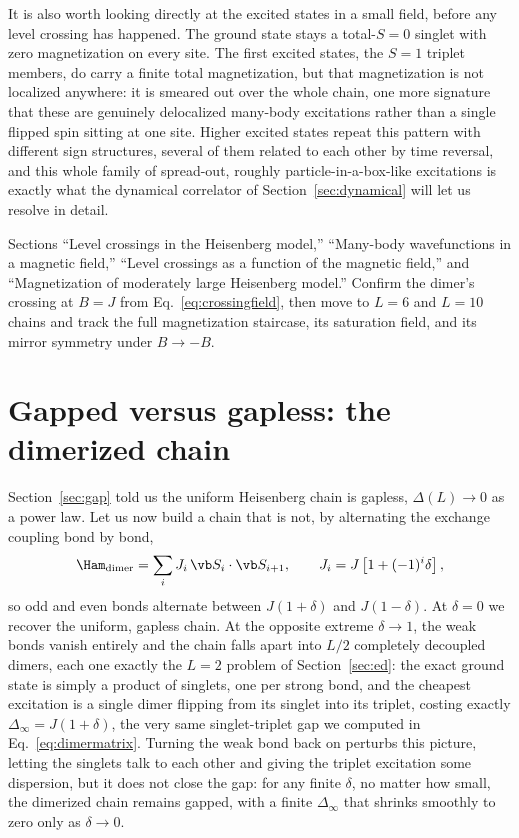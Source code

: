 \documentclass[all_sessions.tex]{subfiles}
\begin{document}
It is also worth looking directly at the excited states in a small field, before any level crossing has
happened. The ground state stays a total-$S=0$ singlet with zero magnetization on every site. The first
excited states, the $S=1$ triplet members, do carry a finite total magnetization, but that magnetization
is not localized anywhere: it is smeared out over the whole chain, one more signature that these are
genuinely delocalized many-body excitations rather than a single flipped spin sitting at one site.
Higher excited states repeat this pattern with different sign structures, several of them related to
each other by time reversal, and this whole family of spread-out, roughly particle-in-a-box-like
excitations is exactly what the dynamical correlator of Section~\ref{sec:dynamical} will let us resolve
in detail.

\begin{notebook}
Sections ``Level crossings in the Heisenberg model,'' ``Many-body wavefunctions in a magnetic
field,'' ``Level crossings as a function of the magnetic field,'' and ``Magnetization of moderately
large Heisenberg model.'' Confirm the dimer's crossing at $B=J$ from Eq.~\eqref{eq:crossingfield},
then move to $L=6$ and $L=10$ chains and track the full magnetization staircase, its saturation field,
and its mirror symmetry under $B\to-B$.
\end{notebook}

\section{Gapped versus gapless: the dimerized chain}
\label{sec:dimerization}
Section~\ref{sec:gap} told us the uniform Heisenberg chain is gapless, $\Delta(L)\to0$ as a power law.
Let us now build a chain that is not, by alternating the exchange coupling bond by bond,
\begin{equation}
  \Ham_{\mathrm{dimer}} = \sum_i J_i\, \vb S_i\cdot\vb S_{i+1}, \qquad
  J_i = J\left[1+(-1)^i\delta\right],
  \label{eq:dimerized}
\end{equation}
so odd and even bonds alternate between $J(1+\delta)$ and $J(1-\delta)$. At $\delta=0$ we recover the
uniform, gapless chain. At the opposite extreme $\delta\to1$, the weak bonds vanish entirely and the
chain falls apart into $L/2$ completely decoupled dimers, each one exactly the $L=2$ problem of
Section~\ref{sec:ed}: the exact ground state is simply a product of singlets, one per strong bond, and
the cheapest excitation is a single dimer flipping from its singlet into its triplet, costing exactly
$\Delta_\infty = J(1+\delta)$, the very same singlet-triplet gap we computed in
Eq.~\eqref{eq:dimermatrix}. Turning the weak bond back on perturbs this picture, letting the singlets
talk to each other and giving the triplet excitation some dispersion, but it does not close the gap: for
any finite $\delta$, no matter how small, the dimerized chain remains gapped, with a finite $\Delta_\infty$
that shrinks smoothly to zero only as $\delta\to0$.
\end{document}
